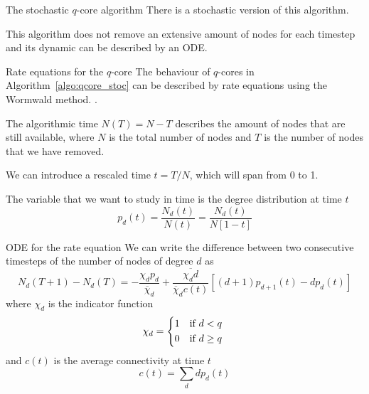 \documentclass[handout]{beamer}
\begin{document}
\begin{frame}{The stochastic $q$-core algorithm}
    There is a stochastic version of this algorithm.

    \begin{algorithm}[H]
        \begin{algorithmic}[1]
            \ENDIF
            \ENDWHILE
        \end{algorithmic}
        \caption{Algorithm for stochastic $q$-core detection}
        \label{algo:qcore_stoc}
    \end{algorithm}

    This algorithm does not remove an extensive amount of nodes for each
    timestep and its dynamic can be described by an ODE.
\end{frame}

\begin{frame}{Rate equations for the $q$-core}
    The behaviour of $q$-cores in Algorithm~\ref{algo:qcore_stoc} can be
    described by \alert{rate equations} using the \alert{Wormwald method}.
    \cite[58]{weigt}.

    The algorithmic time $N(T) = N - T$ describes the amount of nodes that are
    still available, where $N$ is the total number of nodes and $T$ is the
    number of nodes that we have removed.

    We can introduce a \alert{rescaled time} $t = T / N$, which will span from 0
    to 1.

    The variable that we want to study in time is the \alert{degree
    distribution at time $t$}
    \begin{equation}
        p_d(t) = \frac{N_d(t)}{N(t)} = \frac{N_d(t)}{N[1-t]}
        \label{eq:deg_time}
    \end{equation}
\end{frame}

\begin{frame}{ODE for the rate equation}
    We can write the difference between two consecutive timesteps of the number
    of nodes of degree $d$ as
    \begin{equation}
        N_d(T+1) - N_d(T) =
        - \frac{\chi_d p_d}{\overline \chi_d}
        + \frac{\overline{\chi_d d}}{\overline \chi_d c(t)}
        [(d+1) p_{d+1}(t) - dp_d(t)]
        \label{eq:diff_ndeg}
    \end{equation}
    where $\chi_d$ is the \alert{indicator function}
    \begin{equation}
        \chi_d =
        \begin{cases*}
            1 & if $d<q$\\
            0 & if $d\geq q$
        \end{cases*}
        \label{eq:indfunc}
    \end{equation}
    and $c(t)$ is the average connectivity at time $t$
    \begin{equation}
        c(t) = \sum_d d p_d(t)
        \label{eq:avgcon}
    \end{equation}
\end{frame}
\end{document}
